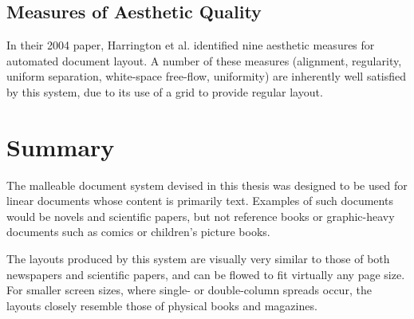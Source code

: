 \subsection{Measures of Aesthetic Quality}
In their 2004 paper, Harrington et al.\hspace{0pt}\cite{Harrington2004} identified nine aesthetic measures for automated document layout. A number of these measures (alignment, regularity, uniform separation, white-space free-flow, uniformity) are inherently well satisfied by this system, due to its use of a grid to provide regular layout. 





\section{Summary}
The malleable document system devised in this thesis was designed to be used for linear documents whose content is primarily text. Examples of such documents would be novels and scientific papers, but not reference books or graphic-heavy documents such as comics or children's picture books.

The layouts produced by this system are visually very similar to those of both newspapers and scientific papers, and can be flowed to fit virtually any page size. For smaller screen sizes, where single- or double-column spreads occur, the layouts closely resemble those of physical books and magazines.

